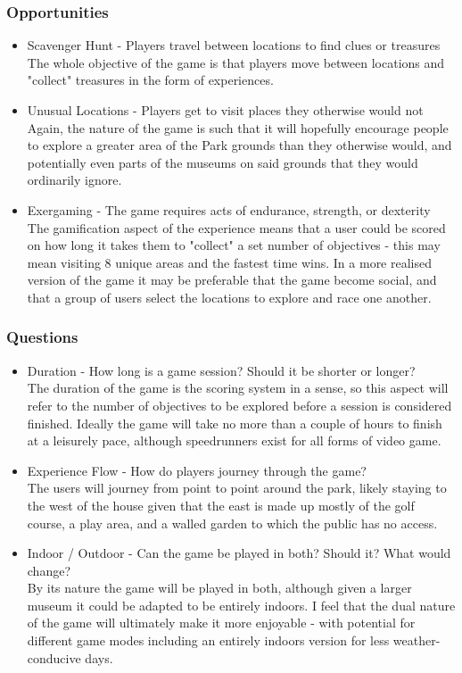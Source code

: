 \documentclass[12pt, a4paper]{article}
\begin{document}
\subsubsection{Opportunities}
\begin{itemize}
  \item Scavenger Hunt - Players travel between locations to find clues or treasures\\
        The whole objective of the game is that players move between locations and "collect" treasures in the form of experiences.
  \item Unusual Locations - Players get to visit places they otherwise would not\\
        Again, the nature of the game is such that it will hopefully encourage people to explore a greater area of the Park grounds than they otherwise would, and potentially even parts of the museums on said grounds that they would ordinarily ignore.
  \item Exergaming - The game requires acts of endurance, strength, or dexterity\\
        The gamification aspect of the experience means that a user could be scored on how long it takes them to "collect" a set number of objectives - this may mean visiting 8 unique areas and the fastest time wins.
        In a more realised version of the game it may be preferable that the game become social, and that a group of users select the locations to explore and race one another.
\end{itemize}

\subsubsection{Questions}
\begin{itemize}
  \item Duration - How long is a game session? Should it be shorter or longer?\\
        The duration of the game is the scoring system in a sense, so this aspect will refer to the number of objectives to be explored before a session is considered finished.
        Ideally the game will take no more than a couple of hours to finish at a leisurely pace, although speedrunners exist for all forms of video game.
  \item Experience Flow - How do players journey through the game?\\
        The users will journey from point to point around the park, likely staying to the west of the house given that the east is made up mostly of the golf course, a play area, and a walled garden to which the public has no access.
  \item Indoor / Outdoor - Can the game be played in both? Should it? What would change?\\
        By its nature the game will be played in both, although given a larger museum it could be adapted to be entirely indoors.
        I feel that the dual nature of the game will ultimately make it more enjoyable - with potential for different game modes including an entirely indoors version for less weather-conducive days.
\end{itemize}
\end{document}
